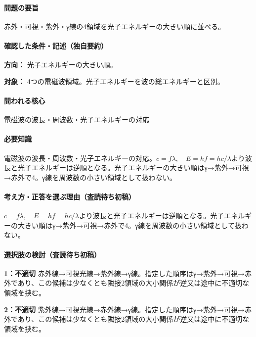 \paragraph{問題の要旨} 赤外・可視・紫外・γ線の4領域を光子エネルギーの大きい順に並べる。

\paragraph{確認した条件・記述（独自要約）}\mbox{}\par

\noindent\textbf{方向：} 光子エネルギーの大きい順。\par

\noindent\textbf{対象：} 4つの電磁波領域。光子エネルギーを波の総エネルギーと区別。\par

\paragraph{問われる核心} 電磁波の波長・周波数・光子エネルギーの対応

\paragraph{必要知識} 電磁波の波長・周波数・光子エネルギーの対応。\(c=f\lambda,\quad E=hf=hc/\lambda\)より波長と光子エネルギーは逆順となる。光子エネルギーの大きい順はγ→紫外→可視→赤外で4。γ線を周波数の小さい領域として扱わない。

\paragraph{考え方・正答を選ぶ理由（査読待ち初稿）} \(c=f\lambda,\quad E=hf=hc/\lambda\)より波長と光子エネルギーは逆順となる。光子エネルギーの大きい順はγ→紫外→可視→赤外で4。γ線を周波数の小さい領域として扱わない。

\paragraph{選択肢の検討（査読待ち初稿）}\mbox{}\par

\noindent\textbf{1：不適切} 赤外線→可視光線→紫外線→γ線。指定した順序はγ→紫外→可視→赤外であり、この候補は少なくとも隣接2領域の大小関係が逆又は途中に不適切な領域を挟む。\par

\noindent\textbf{2：不適切} 紫外線→可視光線→赤外線→γ線。指定した順序はγ→紫外→可視→赤外であり、この候補は少なくとも隣接2領域の大小関係が逆又は途中に不適切な領域を挟む。\par

